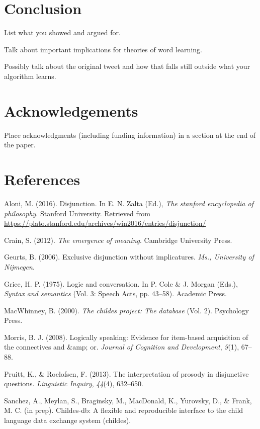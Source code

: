\documentclass[10pt, letterpaper]{article}
\begin{document}
\section{Conclusion}\label{conclusion}

List what you showed and argued for.

Talk about important implications for theories of word learning.

Possibly talk about the original tweet and how that falls still outside
what your algorithm learns.

\section{Acknowledgements}\label{acknowledgements}

Place acknowledgments (including funding information) in a section at
the end of the paper.

\section{References}\label{references}

\setlength{\parindent}{-0.1in} \setlength{\leftskip}{0.125in} \noindent

\hypertarget{refs}{}
\hypertarget{ref-Aloni2016}{}
Aloni, M. (2016). Disjunction. In E. N. Zalta (Ed.), \emph{The stanford
encyclopedia of philosophy}. Stanford University. Retrieved from
\url{https://plato.stanford.edu/archives/win2016/entries/disjunction/}

\hypertarget{ref-crain2012emergence}{}
Crain, S. (2012). \emph{The emergence of meaning}. Cambridge University
Press.

\hypertarget{ref-geurts2006exclusive}{}
Geurts, B. (2006). Exclusive disjunction without implicatures.
\emph{Ms., University of Nijmegen}.

\hypertarget{ref-grice1975logicconvo}{}
Grice, H. P. (1975). Logic and conversation. In P. Cole \& J. Morgan
(Eds.), \emph{Syntax and semantics} (Vol. 3: Speech Acts, pp. 43--58).
Academic Press.

\hypertarget{ref-macwhinney2000childes}{}
MacWhinney, B. (2000). \emph{The childes project: The database} (Vol.
2). Psychology Press.

\hypertarget{ref-morris2008logically}{}
Morris, B. J. (2008). Logically speaking: Evidence for item-based
acquisition of the connectives and \&amp; or. \emph{Journal of Cognition
and Development}, \emph{9}(1), 67--88.

\hypertarget{ref-pruitt2013interpretation}{}
Pruitt, K., \& Roelofsen, F. (2013). The interpretation of prosody in
disjunctive questions. \emph{Linguistic Inquiry}, \emph{44}(4),
632--650.

\hypertarget{ref-childesdb}{}
Sanchez, A., Meylan, S., Braginsky, M., MacDonald, K., Yurovsky, D., \&
Frank, M. C. (in prep). Childes-db: A flexible and reproducible
interface to the child language data exchange system (childes).
\end{document}
